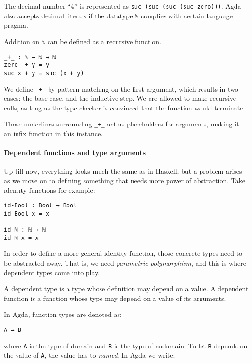 \documentclass[\main/thesis.tex]{subfiles}
\begin{document}
The decimal number ``4'' is represented as {\lstinline|suc (suc (suc (suc zero)))|}.
Agda also accepts decimal literals if the datatype {\lstinline|ℕ|} complies with
certain language pragma.

Addition on {\lstinline|ℕ|} can be defined as a recursive function.

\begin{lstlisting}
_+_ : ℕ → ℕ → ℕ
zero  + y = y
suc x + y = suc (x + y)
\end{lstlisting}

We define {\lstinline|_+_|} by pattern matching on the first argument, which results
in two cases: the base case, and the inductive step. We are allowed to make
recursive calls, as long as the type checker is convinced that the function
would terminate.

Those underlines surrounding {\lstinline|_+_|} act as placeholders for arguments, making
it an infix function in this instance.

\paragraph{Dependent functions and type arguments}

Up till now, everything looks much the same as in Haskell, but a problem arises as
we move on to defining something that needs more power of abstraction. Take identity
functions for example:

\begin{lstlisting}
id-Bool : Bool → Bool
id-Bool x = x

id-ℕ : ℕ → ℕ
id-ℕ x = x
\end{lstlisting}

In order to define a more general identity function, those concrete types need
to be abstracted away. That is, we need \textit{parametric polymorphism}, and this is
where dependent types come into play.

A dependent type is a type whose definition may depend on a value. A dependent
function is a function whose type may depend on a value of its arguments.

In Agda, function types are denoted as:

\begin{lstlisting}
A → B
\end{lstlisting}
%
where {\lstinline|A|} is the type of domain and {\lstinline|B|} is the type of
codomain. To let {\lstinline|B|} depends on the value of {\lstinline|A|}, the
value has to \textit{named}. In Agda we write:
\end{document}
